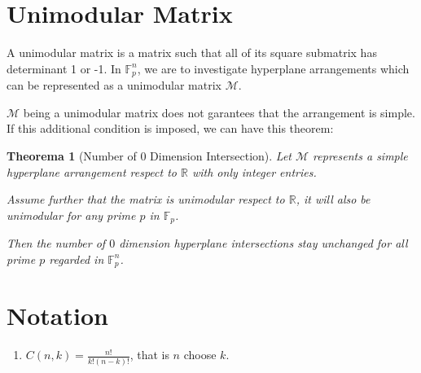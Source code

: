 \documentclass[12pt, a4paper]{article}
\newtheorem{theorem}{Theorema}[subsection]
\theoremstyle{definition}
\theoremstyle{remark}
\newcommand{\bb}[1]{\mathbb{#1}}
\begin{document}
\section{Unimodular Matrix}

A unimodular matrix is a matrix such that all of its square submatrix has determinant 1 or -1. In $\mathbb{F}_p^n$, we are to investigate hyperplane arrangements which can be represented as a unimodular matrix $\mathcal{M}$. 

$\mathcal{M}$ being a unimodular matrix does not garantees that the arrangement is simple. If this additional condition is imposed, we can have this theorem: 

\begin{theorem}[Number of 0 Dimension Intersection]
	Let $\mathcal{M}$ represents a simple hyperplane arrangement respect to $\bb{R}$ with only integer entries.

	Assume further that the matrix is unimodular respect to $\bb{R}$, it will also be unimodular for any prime $p$ in $\mathbb{F}_p$.

	Then the number of $0$ dimension hyperplane intersections stay unchanged for all prime $p$ regarded in $\mathbb{F}_p^n$.
\end{theorem}

\section*{Notation}

\begin{enumerate}
	\item $C(n, k) = \frac{n!}{k!(n-k)!}$, that is $n$ choose $k$.
\end{enumerate}
\end{document}
